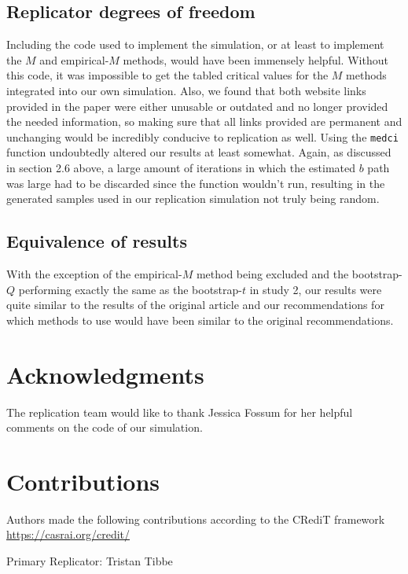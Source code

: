 \documentclass[10,a4paperpaper,]{article}
\begin{document}
\subsection{Replicator degrees of freedom}

Including the code used to implement the simulation, or at least to
implement the \(M\) and empirical-\(M\) methods, would have been
immensely helpful. Without this code, it was impossible to get the
tabled critical values for the \(M\) methods integrated into our own
simulation. Also, we found that both website links provided in the paper
were either unusable or outdated and no longer provided the needed
information, so making sure that all links provided are permanent and
unchanging would be incredibly conducive to replication as well. Using
the \texttt{medci} function undoubtedly altered our results at least
somewhat. Again, as discussed in section 2.6 above, a large amount of
iterations in which the estimated \(b\) path was large had to be
discarded since the function wouldn't run, resulting in the generated
samples used in our replication simulation not truly being random.

\subsection{Equivalence of results}

With the exception of the empirical-\(M\) method being excluded and the
bootstrap-\(Q\) performing exactly the same as the bootstrap-\(t\) in
study 2, our results were quite similar to the results of the original
article and our recommendations for which methods to use would have been
similar to the original recommendations.

\section{Acknowledgments}

The replication team would like to thank Jessica Fossum for her helpful
comments on the code of our simulation.

\section{Contributions}

Authors made the following contributions according to the CRediT
framework \url{https://casrai.org/credit/}

Primary Replicator: Tristan Tibbe
\end{document}
